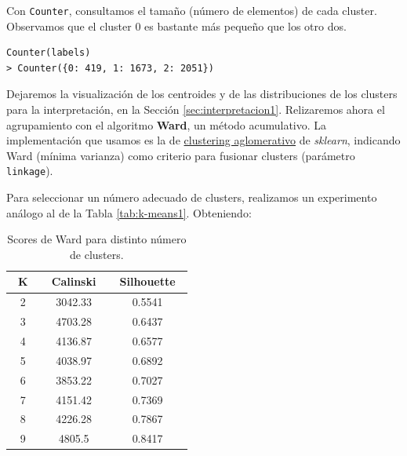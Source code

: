 \documentclass[oneside]{book}
\begin{document}
Con \texttt{Counter}, consultamos el tamaño (número de elementos) de
cada cluster. Observamos que el cluster 0 es bastante más pequeño que
los otro dos.
\begin{verbatim}
Counter(labels)
> Counter({0: 419, 1: 1673, 2: 2051})
\end{verbatim}

Dejaremos la visualización de los centroides y de las distribuciones
de los clusters para la interpretación, en la Sección
\ref{sec:interpretacion1}. Relizaremos ahora el agrupamiento con el
algoritmo \textbf{Ward}, un método acumulativo. La implementación que
usamos es la de
\href{https://scikit-learn.org/stable/modules/generated/sklearn.cluster.AgglomerativeClustering.html}{clustering
  aglomerativo} de \textit{sklearn}, indicando Ward (mínima varianza)
como criterio para fusionar clusters (parámetro \texttt{linkage}).

Para seleccionar un número adecuado de clusters, realizamos un
experimento análogo al de la Tabla \ref{tab:k-means1}. Obteniendo:

\begin{table}[H]
  \centering
\begin{tabular}{|c|cc|}
  \hline
  ~\hspace{2mm}K\hspace{2mm}~ & ~\hspace{2mm}Calinski\hspace{2mm}~ & ~\hspace{2mm}Silhouette\hspace{2mm}~ \\ \hline
2 & 3042.33 & 0.5541 \\ \hline
3 & 4703.28 & 0.6437 \\ \hline
4 & 4136.87 & 0.6577 \\ \hline
5 & 4038.97 & 0.6892 \\ \hline
6 & 3853.22 & 0.7027 \\ \hline
7 & 4151.42 & 0.7369 \\ \hline
8 & 4226.28 & 0.7867 \\ \hline
9 & 4805.5 & 0.8417 \\ \hline
\end{tabular}
\caption{Scores de Ward para distinto número de clusters.}
\label{tab:ward1}
\end{table}
\end{document}
